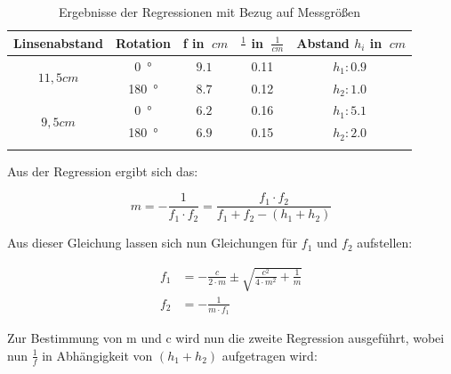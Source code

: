 \begin{table}[h!]
    \begin{center}
        \caption{Ergebnisse der Regressionen mit Bezug auf Messgrößen}
        \begin{tabular}{ccccc}
            \hline
            Linsenabstand           & Rotation          & f in $\SI{}{cm}$  & $\frac{1}{}$ in $\SI{}{\frac{1}{cm}}$ & Abstand $h_i$ in $\SI{}{cm}$\\
            \hline
            
            \multirow{2}{*}{$11,5cm$}   & \SI{0}{\degree}   & $\SI{9,1}{}$      & {\SI{0,11}{}}  & $h_1: \SI{0,9}{}$ \\
                                        & \SI{180}{\degree} & $\SI{8,7}{}$      & {\SI{0,12}{}}  & $h_2: \SI{1,0}{}$ \\
            \hline
            \multirow{2}{*}{$9,5cm$}    & \SI{0}{\degree}   & $\SI{6,2}{}$      & {\SI{0,16}{}}  & $h_1: \SI{5,1}{}$ \\
                                        & \SI{180}{\degree} & $\SI{6,9}{}$      & {\SI{0,15}{}}  & $h_2: \SI{2,0}{}$ \\
            \hline
            \label{tab:abbe-Regression-Werte}
        \end{tabular}
    \end{center}
\end{table}

\clearpage

Aus der Regression ergibt sich das:

\begin{equation}
    m = - \frac{1}{f_1 \cdot f_2} = \frac{f_1 \cdot f_2}{f_1 + f_2 - (h_1 + h_2)}
\end{equation}

Aus dieser Gleichung lassen sich nun Gleichungen für $f_1$ und $f_2$ aufstellen:

\begin{align}
f_1 &= - \frac{c}{2 \cdot m} \pm \sqrt{\frac{c^2}{4 \cdot m^2} + \frac{1}{m}} \\
f_2 &= - \frac{1}{m \cdot f_1}
\end{align}

Zur Bestimmung von m und c wird nun die zweite Regression ausgeführt, wobei nun $\frac{1}{f}$ in Abhängigkeit von $(h_1 + h_2)$ aufgetragen wird:

